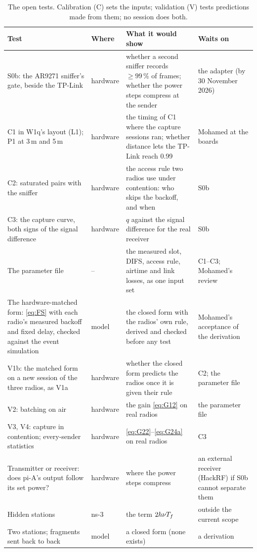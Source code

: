 \documentclass[11pt,a4paper]{article}
\begin{document}
\begin{table}[htbp]
\centering\small
\begin{tabularx}{\textwidth}{>{\raggedright\arraybackslash}p{3.6cm}>{\raggedright\arraybackslash}p{1.9cm}L>{\raggedright\arraybackslash}p{2.9cm}}
\toprule
Test & Where & What it would show & Waits on \\
\midrule
S0b: the AR9271 sniffer's gate, beside the TP-Link & hardware & whether a second sniffer records $\ge99\,\%$ of frames; whether the power steps compress at the sender & the adapter (by 30 November 2026) \\
C1 in W1q's layout (L1); P1 at 3\,m and 5\,m & hardware & the timing of C1 where the capture sessions ran; whether distance lets the TP-Link reach 0.99 & Mohamed at the boards \\
C2: saturated pairs with the sniffer & hardware & the access rule two radios use under contention: who skips the backoff, and when & S0b \\
C3: the capture curve, both signs of the signal difference & hardware & $q$ against the signal difference for the real receiver & S0b \\
The parameter file & -- & the measured slot, DIFS, access rule, airtime and link losses, as one input set & C1--C3; Mohamed's review \\
The hardware-matched form: \eqref{eq:FS} with each radio's measured backoff and fixed delay, checked against the event simulation & model & the closed form with the radios' own rule, derived and checked before any test & Mohamed's acceptance of the derivation \\
V1b: the matched form on a new session of the three radios, as V1a & hardware & whether the closed form predicts the radios once it is given their rule & C2; the parameter file \\
V2: batching on air & hardware & the gain \eqref{eq:G12} on real radios & the parameter file \\
V3, V4: capture in contention; every-sender statistics & hardware & \eqref{eq:G22}--\eqref{eq:G24a} on real radios & C3 \\
Transmitter or receiver: does pi-A's output follow its set power? & hardware & where the power steps compress & an external receiver (HackRF) if S0b cannot separate them \\
Hidden stations & ns-3 & the term $2h\nu T_f$ & outside the current scope \\
Two stations; fragments sent back to back & model & a closed form (none exists) & a derivation \\
\bottomrule
\end{tabularx}
\caption{The open tests. Calibration (C) sets the inputs; validation (V) tests predictions made from
them; no session does both.}
\label{tab:next}
\end{table}
\end{document}
